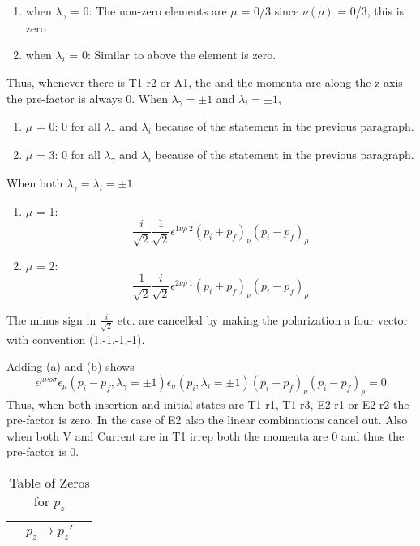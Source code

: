 \documentclass[10pt]{article}
\begin{document}
\begin{enumerate}
\begin{enumerate}
\item when $\lambda_\gamma$ = 0: The non-zero elements are $\mu$ = 0/3 since $\nu(\rho)$ = 0/3, this is zero
\item when $\lambda_i$ = 0:  Similar to above the element is zero.
\end{enumerate}
\par Thus, whenever there is T1 r2 or A1, the and the momenta are along the z-axis the pre-factor is always 0. When $\lambda_\gamma = \pm 1$ and $\lambda_i = \pm 1$,
\begin{enumerate}
\item $\mu$ = 0:  0 for all $\lambda_\gamma$ and $\lambda_i$ because of the statement in the previous paragraph.
\item $\mu$ = 3:  0 for all $\lambda_\gamma$ and $\lambda_i$ because of the statement in the previous paragraph.
\end{enumerate}
When both $\lambda_\gamma = \lambda_i = \pm 1$
\begin{enumerate}
\item $\mu$ = 1:  $$\frac{i}{\sqrt{2}} \frac{1}{\sqrt{2}} \epsilon^{1\nu\rho\ 2} (p_i + p_f)_{\nu}(p_i - p_f)_{\rho}$$
\item $\mu$ = 2:  $$\frac{1}{\sqrt{2}} \frac{i}{\sqrt{2}}\epsilon^{2\nu\rho\ 1} (p_i + p_f)_{\nu}(p_i - p_f)_{\rho} $$
\end{enumerate}
The minus sign in $\frac{i}{\sqrt{2}} $ etc. are cancelled by making the polarization a four vector with convention (1,-1,-1,-1). \par
Adding (a) and (b) shows
$$\epsilon^{\mu\nu\rho\sigma}\epsilon_{\mu}(p_i - p_f, \lambda_{\gamma} = \pm 1)\epsilon_{\sigma}(p_i, \lambda_i = \pm 1)(p_i + p_f)_{\nu}(p_i - p_f)_{\rho} = 0$$
Thus, when both insertion and initial states are T1 r1, T1 r3, E2 r1 or E2 r2 the pre-factor is zero. In the case of E2 also the linear combinations cancel out. Also when both V and Current are in T1 irrep both the momenta are 0 and thus the pre-factor is 0. \par


\begin{table}[!htbp]
\caption {Table of Zeros for $p_z$}
\begin{minipage}{0.33\textwidth}
\raggedright
\begin{tabular}{cc c}
 &$p_z \rightarrow p_z' $&\\ \hline
 

\end{tabular}
\end{minipage}
\end{table}
\end{enumerate}
\end{document}
